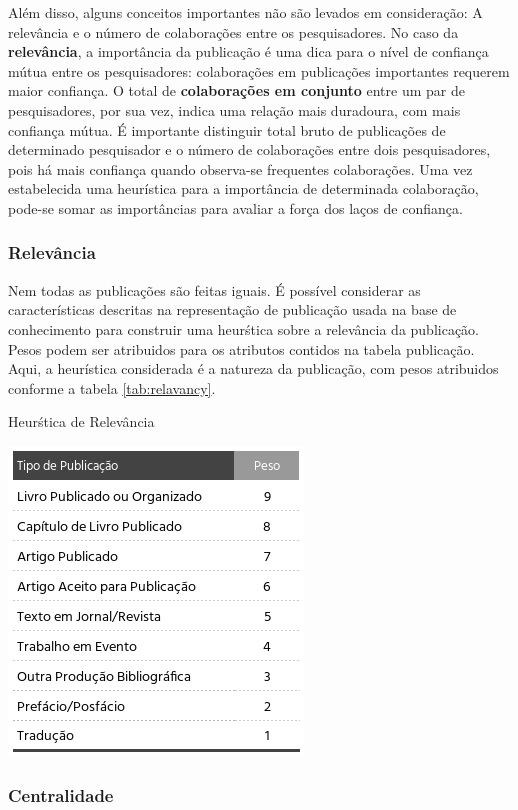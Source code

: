 \documentclass[12pt]{article}
\begin{document}
Além disso, alguns conceitos importantes não são levados em consideração: A relevância e o número de colaborações entre os 
pesquisadores. No caso da \textbf{relevância}, a importância da publicação é uma dica para o nível de confiança mútua entre os 
pesquisadores: colaborações em publicações importantes requerem maior confiança. O total de \textbf{colaborações em conjunto} 
entre um par de pesquisadores, por sua vez, indica uma relação mais duradoura, com mais confiança mútua. É importante distinguir 
total bruto de publicações de determinado pesquisador e o número de colaborações entre dois pesquisadores, pois há mais confiança 
quando observa-se frequentes colaborações.  Uma vez estabelecida uma heurística para a importância de determinada colaboração, 
pode-se somar as importâncias para avaliar a força dos laços de confiança.

\subsubsection{Relevância}

Nem todas as publicações são feitas iguais. É possível considerar as características descritas na representação de publicação 
usada na base de conhecimento para construir uma heurśtica sobre a relevância da publicação. Pesos podem ser atribuidos para os 
atributos contidos na tabela publicação. Aqui, a heurística considerada é a natureza da publicação, com pesos atribuidos conforme 
a tabela \ref{tab:relavancy}.

\begin{center}
  \begin{table}[ht]
    \centering
    \caption{Heurśtica de Relevância}
    \label{tab:relavancy}
    \includegraphics[width=.4\textwidth]{heuristics.png}
    \end{table}
\end{center}

\subsubsection{Centralidade}
\end{document}
